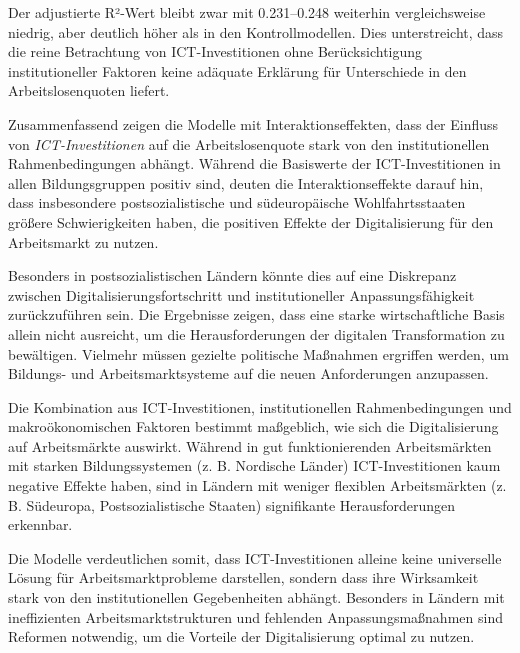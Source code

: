 Der adjustierte R²-Wert bleibt zwar mit 0.231–0.248 weiterhin vergleichsweise niedrig, 
aber deutlich höher als in den Kontrollmodellen. Dies unterstreicht, dass die reine 
Betrachtung von ICT-Investitionen ohne Berücksichtigung institutioneller Faktoren keine 
adäquate Erklärung für Unterschiede in den Arbeitslosenquoten liefert.

Zusammenfassend zeigen die Modelle mit Interaktionseffekten, dass der Einfluss von 
\textit{\ac{ICT}-Investitionen} auf die Arbeitslosenquote stark von den institutionellen 
Rahmenbedingungen abhängt. Während die Basiswerte der ICT-Investitionen in allen 
Bildungsgruppen positiv sind, deuten die Interaktionseffekte darauf hin, dass insbesondere 
postsozialistische und südeuropäische Wohlfahrtsstaaten größere Schwierigkeiten haben, 
die positiven Effekte der Digitalisierung für den Arbeitsmarkt zu nutzen. 

Besonders in postsozialistischen Ländern könnte dies auf eine Diskrepanz zwischen 
Digitalisierungsfortschritt und institutioneller Anpassungsfähigkeit zurückzuführen sein. 
Die Ergebnisse zeigen, dass eine starke wirtschaftliche Basis allein nicht ausreicht, um 
die Herausforderungen der digitalen Transformation zu bewältigen. Vielmehr müssen 
gezielte politische Maßnahmen ergriffen werden, um Bildungs- und Arbeitsmarktsysteme auf 
die neuen Anforderungen anzupassen.

Die Kombination aus ICT-Investitionen, institutionellen Rahmenbedingungen und 
makroökonomischen Faktoren bestimmt maßgeblich, wie sich die Digitalisierung auf 
Arbeitsmärkte auswirkt. Während in gut funktionierenden Arbeitsmärkten mit starken 
Bildungssystemen (z. B. Nordische Länder) ICT-Investitionen kaum negative Effekte haben, 
sind in Ländern mit weniger flexiblen Arbeitsmärkten (z. B. Südeuropa, 
Postsozialistische Staaten) signifikante Herausforderungen erkennbar.

Die Modelle verdeutlichen somit, dass ICT-Investitionen alleine keine universelle Lösung 
für Arbeitsmarktprobleme darstellen, sondern dass ihre Wirksamkeit stark von den 
institutionellen Gegebenheiten abhängt. Besonders in Ländern mit ineffizienten 
Arbeitsmarktstrukturen und fehlenden Anpassungsmaßnahmen sind Reformen notwendig, um 
die Vorteile der Digitalisierung optimal zu nutzen.
